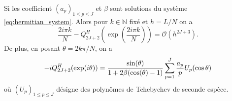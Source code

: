 \begin{proposition}
Si les coefficient $(a_p)_{1 \leq p \leq J}$ et $\beta$ sont solutions du système \eqref{eq:hermitian_system}. Alors pour $k \in \mathbb{N}$ fixé et $h=L/N$ on a
\begin{equation}
\dfrac{2 i \pi k}{N} - Q_{2J+2}^H \left( \exp \left( \dfrac{2 i \pi k}{N} \right) \right) = \mathcal{O}(h^{2J+3}).
\end{equation}
De plus, en posant $\theta = 2 k \pi / N$, on a
\begin{equation}
- i Q_{2J+2}^H(\exp (i \theta) ) = \dfrac{\sin(\theta)}{1 +2 \beta (\cos (\theta) -1)} \displaystyle\sum\limits_{p=1}^J \dfrac{a_p}{p} U_p (\cos \theta ) 
\end{equation}
où $(U_p)_{1 \leq p \leq J}$ désigne des polynômes de Tchebychev de seconde espèce.
\label{prop:hermitien_polynome}
\end{proposition}

